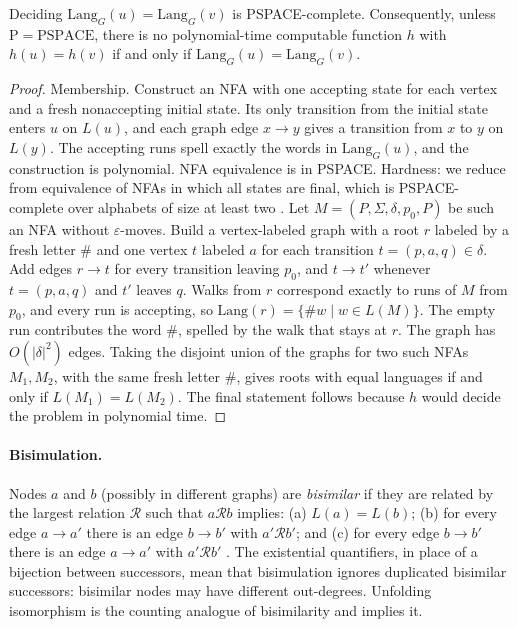 \documentclass[twoside,leqno]{article}
\begin{document}
\begin{prop}
\label{prop:pspace}
Deciding $\text{Lang}_G(u)=\text{Lang}_G(v)$ is PSPACE-complete. Consequently, unless $\mathrm{P}=\mathrm{PSPACE}$, there is no polynomial-time computable function $h$ with $h(u)=h(v)$ if and only if $\text{Lang}_G(u)=\text{Lang}_G(v)$.
\end{prop}
\begin{proof}
Membership. Construct an NFA with one accepting state for each vertex and a fresh nonaccepting initial state. Its only transition from the initial state enters $u$ on $L(u)$, and each graph edge $x\to y$ gives a transition from $x$ to $y$ on $L(y)$. The accepting runs spell exactly the words in $\text{Lang}_G(u)$, and the construction is polynomial. NFA equivalence is in PSPACE.
Hardness: we reduce from equivalence of NFAs in which all states are final, which is PSPACE-complete over alphabets of size at least two \cite{kao2009nfas}. Let $M=(P,\Sigma,\delta,p_0,P)$ be such an NFA without $\varepsilon$-moves. Build a vertex-labeled graph with a root $r$ labeled by a fresh letter $\#$ and one vertex $t$ labeled $a$ for each transition $t=(p,a,q)\in\delta$. Add edges $r \to t$ for every transition leaving $p_0$, and $t \to t'$ whenever $t=(p,a,q)$ and $t'$ leaves $q$. Walks from $r$ correspond exactly to runs of $M$ from $p_0$, and every run is accepting, so $\text{Lang}(r) = \{\#w \mid w\in L(M)\}$. The empty run contributes the word $\#$, spelled by the walk that stays at $r$. The graph has $O(|\delta|^2)$ edges. Taking the disjoint union of the graphs for two such NFAs $M_1,M_2$, with the same fresh letter $\#$, gives roots with equal languages if and only if $L(M_1)=L(M_2)$. The final statement follows because $h$ would decide the problem in polynomial time.
\end{proof}

\paragraph{Bisimulation.} Nodes $a$ and $b$ (possibly in different graphs) are \emph{bisimilar} if they are related by the largest relation $\mathcal{R}$ such that $a\mathcal{R}b$ implies: (a) $L(a)=L(b)$; (b) for every edge $a\to a'$ there is an edge $b\to b'$ with $a'\mathcal{R}b'$; and (c) for every edge $b\to b'$ there is an edge $a\to a'$ with $a'\mathcal{R}b'$ \cite{bisimulation_book}. The existential quantifiers, in place of a bijection between successors, mean that bisimulation ignores duplicated bisimilar successors: bisimilar nodes may have different out-degrees. Unfolding isomorphism is the counting analogue of bisimilarity and implies it.
\end{document}
